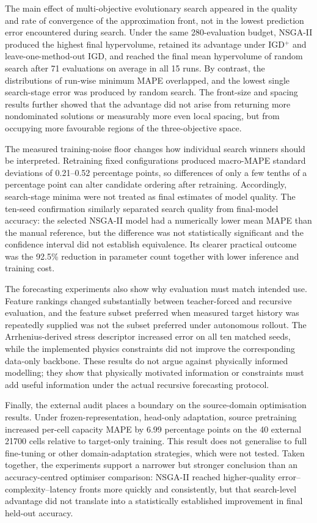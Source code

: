 \documentclass[a4paper,fleqn]{cas-sc}
\begin{document}
The main effect of multi-objective evolutionary search appeared in the quality and rate of convergence of the approximation front, not in the lowest prediction error encountered during search. Under the same 280-evaluation budget, NSGA-II produced the highest final hypervolume, retained its advantage under IGD$^{+}$ and leave-one-method-out IGD, and reached the final mean hypervolume of random search after 71 evaluations on average in all 15 runs. By contrast, the distributions of run-wise minimum MAPE overlapped, and the lowest single search-stage error was produced by random search. The front-size and spacing results further showed that the advantage did not arise from returning more nondominated solutions or measurably more even local spacing, but from occupying more favourable regions of the three-objective space.

The measured training-noise floor changes how individual search winners should be interpreted. Retraining fixed configurations produced macro-MAPE standard deviations of 0.21--0.52 percentage points, so differences of only a few tenths of a percentage point can alter candidate ordering after retraining. Accordingly, search-stage minima were not treated as final estimates of model quality. The ten-seed confirmation similarly separated search quality from final-model accuracy: the selected NSGA-II model had a numerically lower mean MAPE than the manual reference, but the difference was not statistically significant and the confidence interval did not establish equivalence. Its clearer practical outcome was the 92.5\% reduction in parameter count together with lower inference and training cost.

The forecasting experiments also show why evaluation must match intended use. Feature rankings changed substantially between teacher-forced and recursive evaluation, and the feature subset preferred when measured target history was repeatedly supplied was not the subset preferred under autonomous rollout. The Arrhenius-derived stress descriptor increased error on all ten matched seeds, while the implemented physics constraints did not improve the corresponding data-only backbone. These results do not argue against physically informed modelling; they show that physically motivated information or constraints must add useful information under the actual recursive forecasting protocol.

Finally, the external audit places a boundary on the source-domain optimisation results. Under frozen-representation, head-only adaptation, source pretraining increased per-cell capacity MAPE by 6.99 percentage points on the 40 external 21700 cells relative to target-only training. This result does not generalise to full fine-tuning or other domain-adaptation strategies, which were not tested. Taken together, the experiments support a narrower but stronger conclusion than an accuracy-centred optimiser comparison: NSGA-II reached higher-quality error--complexity--latency fronts more quickly and consistently, but that search-level advantage did not translate into a statistically established improvement in final held-out accuracy.
\end{document}
